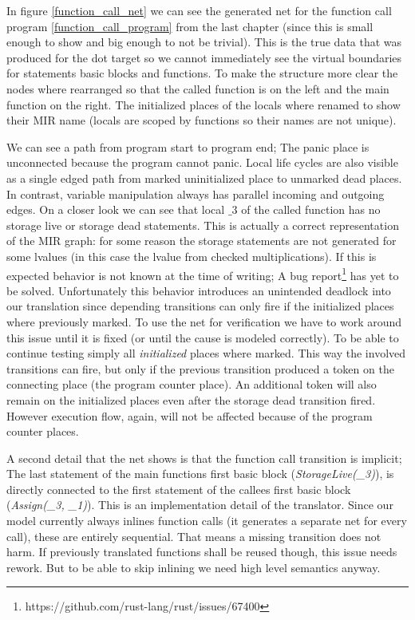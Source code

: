 In figure \ref{function_call_net} we can see the generated net for the function call program \ref{function_call_program} from the last chapter (since this is small enough to show and big enough to not be trivial).
This is the true data that was produced for the dot target so we cannot immediately see the virtual boundaries for statements basic blocks and functions.
To make the structure more clear the nodes where rearranged so that the called function is on the left and the main function on the right.
The initialized places of the locals where renamed to show their MIR name (locals are scoped by functions so their names are not unique).

We can see a path from program start to program end;
The panic place is unconnected because the program cannot panic.
Local life cycles are also visible as a single edged path from marked uninitialized place to unmarked dead places.
In contrast, variable manipulation always has parallel incoming and outgoing edges.
On a closer look we can see that local $\_3$ of the called function has no storage live or storage dead statements.
This is actually a correct representation of the MIR graph:
for some reason the storage statements are not generated for some lvalues (in this case the lvalue from checked multiplications).
If this is expected behavior is not known at the time of writing;
A bug report\footnote{https://github.com/rust-lang/rust/issues/67400} has yet to be solved.
Unfortunately this behavior introduces an unintended deadlock into our translation since depending transitions can only fire if the initialized places where previously marked.
To use the net for verification we have to work around this issue until it is fixed (or until the cause is modeled correctly).
To be able to continue testing simply all \textit{initialized} places where marked.
This way the involved transitions can fire, but only if the previous transition produced a token on the connecting place (the program counter place). 
An additional token will also remain on the initialized places even after the storage dead transition fired.
However execution flow, again, will not be affected because of the program counter places.

A second detail that the net shows is that the function call transition is implicit;
The last statement of the main functions first basic block (\textit{StorageLive(\_3)}), is directly connected to the first statement of the callees first basic block (\textit{Assign(\_3, \_1)}).
This is an implementation detail of the translator.
Since our model currently always inlines function calls (it generates a separate net for every call), these are entirely sequential.
That means a missing transition does not harm.
If previously translated functions shall be reused though, this issue needs rework.
But to be able to skip inlining we need high level semantics anyway.

